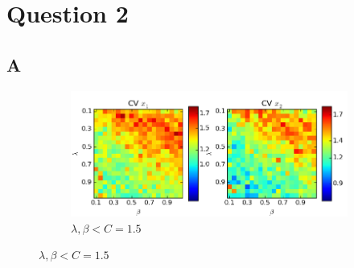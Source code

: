 \documentclass[a4paper,12pt]{article}
\begin{document}
\section*{Question 2}

\subsection*{A}
\begin{figure}[!ht]
        \centering
        \begin{subfigure}[b]{0.496\textwidth}
                \includegraphics[width=\textwidth]{images/vars1}
                \caption{$\lambda, \beta < C=1.5$}
                \label{fig:vars1}
        \end{subfigure}%
        

\end{figure}
\end{document}
